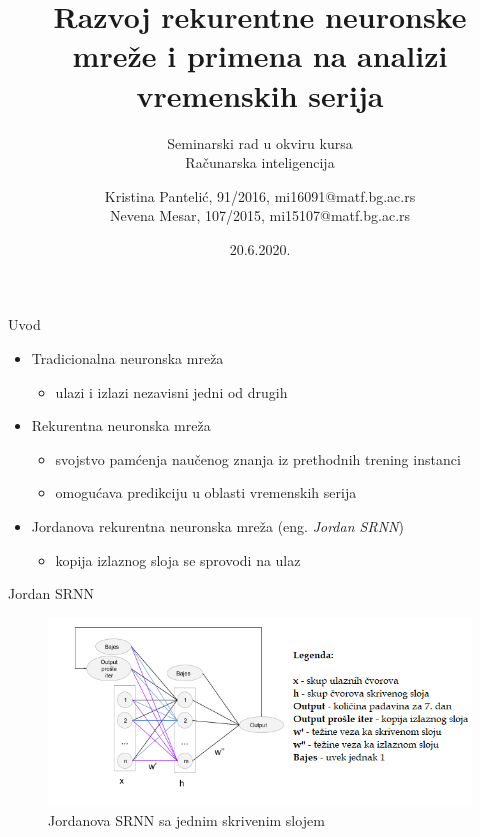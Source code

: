 \documentclass{beamer}
\title{Razvoj rekurentne neuronske mreže i primena na analizi \\ vremenskih serija}
\subtitle{\small{Seminarski rad u okviru kursa\\Računarska inteligencija}}
\author{\small{Kristina Pantelić, 91/2016, mi16091@matf.bg.ac.rs \\Nevena Mesar, 107/2015, mi15107@matf.bg.ac.rs }}
\institute{Matematički fakultet}
\date{20.6.2020.}
\begin{document}
\begin{frame}
    \maketitle
\end{frame}

\begin{frame}{Uvod}
    \begin{itemize}
        \item Tradicionalna neuronska mreža
            \begin{itemize}
             \item ulazi i izlazi nezavisni jedni od drugih
            \end{itemize} 
        \item Rekurentna neuronska mreža
             \begin{itemize}
             \item svojstvo pamćenja naučenog znanja iz prethodnih trening instanci
             \item omogućava predikciju u oblasti vremenskih serija
              \end{itemize}
        \item Jordanova rekurentna neuronska mreža (eng. \textit{Jordan SRNN})
            \begin{itemize}
             \item kopija izlaznog sloja se sprovodi na ulaz
            \end{itemize}
    \end{itemize}
\end{frame}

\begin{frame}{Jordan SRNN}
    \begin{figure}
        \centering
        \includegraphics[scale=0.6]{net.png}
        \caption{Jordanova SRNN sa jednim skrivenim slojem}
    \end{figure}
\end{frame}
\end{document}
